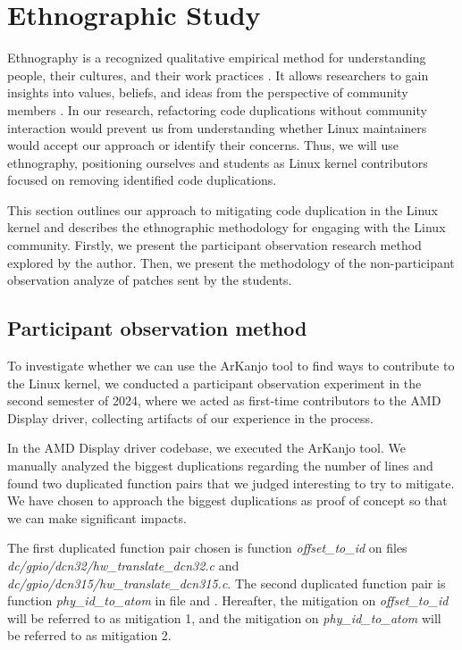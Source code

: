 \section{Ethnographic Study}

\label{sec:meteth}

Ethnography is a recognized qualitative empirical method for understanding people, 
their cultures, and their work practices \citep{bookethno}. It allows researchers 
to gain insights into values, beliefs, and ideas from the perspective of community 
members \citep{ethnosoft}. In our research, refactoring code duplications without 
community interaction would prevent us from understanding whether Linux maintainers 
would accept our approach or identify their concerns. Thus, we will use ethnography, 
positioning ourselves and students as Linux kernel contributors focused on removing 
identified  code duplications.

This section outlines our approach to mitigating code duplication in the Linux kernel 
and describes the ethnographic methodology for engaging with the Linux community. 
Firstly, we present the participant observation research method explored by the author. 
Then, we present the methodology of the non-participant observation analyze of patches 
sent by the students.

\subsection{Participant observation method}
\label{subsec:partmethod}

To investigate whether we can use the ArKanjo tool to find ways to contribute to the 
Linux kernel, we conducted a participant observation experiment in the second semester 
of 2024, where we acted as first-time contributors to the AMD Display driver, collecting 
artifacts of our experience in the process.

In the AMD Display driver codebase, we executed the ArKanjo tool. 
We manually analyzed the biggest duplications regarding the number of lines and found 
two duplicated function pairs that we judged interesting to try to mitigate. We 
have chosen to approach the biggest duplications as proof of concept so that we 
can make significant impacts. 

The first duplicated function pair chosen is function \textit{offset\_to\_id} on files \textit{dc/gpio/dcn32/hw\_translate\_dcn32.c} and \textit{dc/gpio/dcn315/hw\_translate\_dcn315.c}. The second duplicated function pair is function \textit{phy\_id\_to\_atom} in file 
\textit{ } and \textit{}.
Hereafter, the mitigation on \textit{offset\_to\_id} will be referred to as mitigation 1, and the mitigation on 
\textit{phy\_id\_to\_atom} will be referred to as mitigation 2.

